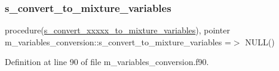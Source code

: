 \subsubsection{\texorpdfstring{s\+\_\+convert\+\_\+to\+\_\+mixture\+\_\+variables}{s\_convert\_to\_mixture\_variables}}
{\footnotesize\ttfamily procedure(\hyperlink{interfacem__variables__conversion_1_1s__convert__xxxxx__to__mixture__variables}{s\+\_\+convert\+\_\+xxxxx\+\_\+to\+\_\+mixture\+\_\+variables}), pointer m\+\_\+variables\+\_\+conversion\+::s\+\_\+convert\+\_\+to\+\_\+mixture\+\_\+variables =$>$ N\+U\+LL()}



Definition at line 90 of file m\+\_\+variables\+\_\+conversion.\+f90.

